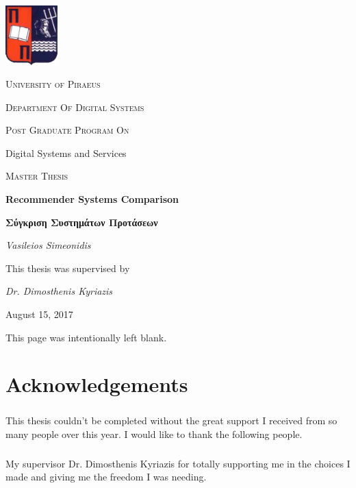 \documentclass[10pt, a4paper, oneside]{journal}
\begin{document}
	\begin{titlepage}
		\centering
		\includegraphics[width=0.15\textwidth]{../images/UniversityOfPiraeusLogo.png}\par\vspace{1cm}
		{\scshape\LARGE University of Piraeus \par}
		\vspace{1cm}
		{\scshape\Large Department Of Digital Systems \par}
		\vspace{1cm}
		{\scshape\Large Post Graduate Program On \par Digital Systems and Services \par}
		\vspace{1cm}
		{\scshape\Large Master Thesis\par}
		\vspace{1cm}
		{\huge\bfseries Recommender Systems Comparison\par}
		\vspace{2cm}
		{\bfseries \large Σύγκριση Συστημάτων Προτάσεων\par}
		\vfill
		{\Large\itshape Vasileios Simeonidis\par}
	\end{titlepage}
	
	\newpage 
	{
		\centering
		This thesis was supervised by\par
		\textit{Dr. Dimosthenis Kyriazis}
		\vfill
		{\large August 15, 2017\par}
	}
	\clearpage
	\begin{center}
		This page was intentionally left blank.
	\end{center}
	\newpage
	\chapter{Acknowledgements}
	
	\paragraph{} This thesis couldn't be completed without the great support I received from so many people over this year. I would like to thank the following people.
	
	\paragraph{} My supervisor Dr. Dimosthenis Kyriazis for totally supporting me in the choices I made and giving me the freedom I was needing.
	
\end{document}
